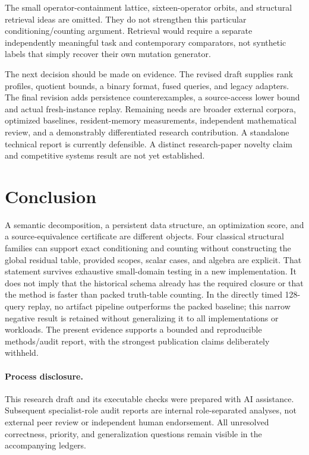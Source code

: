 \documentclass[11pt]{article}
\theoremstyle{definition}\newtheorem{definition}[theorem]{Definition}
\theoremstyle{remark}\newtheorem{remark}[theorem]{Remark}
\begin{document}
The small operator-containment lattice, sixteen-operator orbits, and structural retrieval ideas are omitted. They do not strengthen this particular conditioning/counting argument. Retrieval would require a separate independently meaningful task and contemporary comparators, not synthetic labels that simply recover their own mutation generator.

The next decision should be made on evidence. The revised draft supplies rank profiles, quotient bounds, a binary format, fused queries, and legacy adapters. The final revision adds persistence counterexamples, a source-access lower bound and actual fresh-instance replay. Remaining needs are broader external corpora, optimized baselines, resident-memory measurements, independent mathematical review, and a demonstrably differentiated research contribution. A standalone technical report is currently defensible. A distinct research-paper novelty claim and competitive systems result are not yet established.

\section{Conclusion}
A semantic decomposition, a persistent data structure, an optimization score, and a source-equivalence certificate are different objects. Four classical structural families can support exact conditioning and counting without constructing the global residual table, provided scopes, scalar cases, and algebra are explicit. That statement survives exhaustive small-domain testing in a new implementation. It does not imply that the historical schema already has the required closure or that the method is faster than packed truth-table counting. In the directly timed 128-query replay, no artifact pipeline outperforms the packed baseline; this narrow negative result is retained without generalizing it to all implementations or workloads. The present evidence supports a bounded and reproducible methods/audit report, with the strongest publication claims deliberately withheld.

\paragraph{Process disclosure.}
This research draft and its executable checks were prepared with AI assistance. Subsequent specialist-role audit reports are internal role-separated analyses, not external peer review or independent human endorsement. All unresolved correctness, priority, and generalization questions remain visible in the accompanying ledgers.


\end{document}

